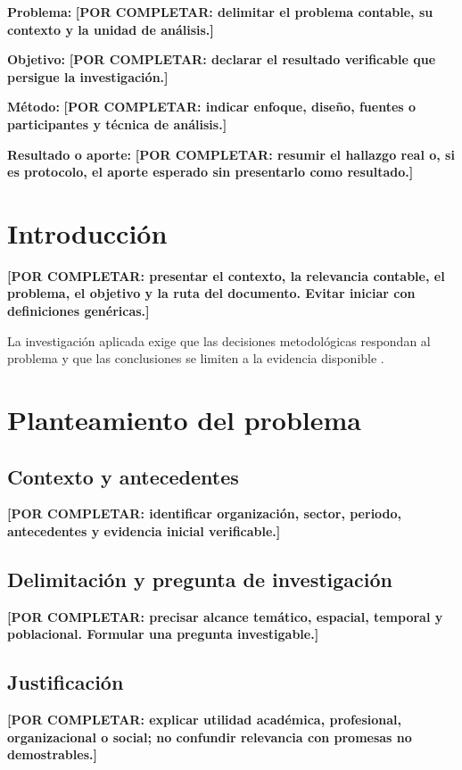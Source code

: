 \documentclass[spanish,letterpaper,oneside]{article}
\newcommand{\porcompletar}[1]{\textcolor{uasBlue}{\textbf{[POR COMPLETAR: #1]}}}
\begin{document}
\templatePortrait
\templatePagecfg
\onehalfspacing

\begin{abstractd}
  \textbf{Problema:} \porcompletar{delimitar el problema contable, su contexto y la unidad de análisis.}

  \textbf{Objetivo:} \porcompletar{declarar el resultado verificable que persigue la investigación.}

  \textbf{Método:} \porcompletar{indicar enfoque, diseño, fuentes o participantes y técnica de análisis.}

  \textbf{Resultado o aporte:} \porcompletar{resumir el hallazgo real o, si es protocolo, el aporte esperado sin presentarlo como resultado.}
\end{abstractd}

\templateIndex
\templateFinalcfg

\section{Introducción}
\porcompletar{presentar el contexto, la relevancia contable, el problema, el objetivo y la ruta del documento. Evitar iniciar con definiciones genéricas.}

La investigación aplicada exige que las decisiones metodológicas respondan al problema y que las conclusiones se limiten a la evidencia disponible \citep{hernandezSampieriMetodologia2018,creswellResearchDesign2018}.

\section{Planteamiento del problema}
\subsection{Contexto y antecedentes}
\porcompletar{identificar organización, sector, periodo, antecedentes y evidencia inicial verificable.}

\subsection{Delimitación y pregunta de investigación}
\porcompletar{precisar alcance temático, espacial, temporal y poblacional. Formular una pregunta investigable.}

\subsection{Justificación}
\porcompletar{explicar utilidad académica, profesional, organizacional o social; no confundir relevancia con promesas no demostrables.}
\end{document}
